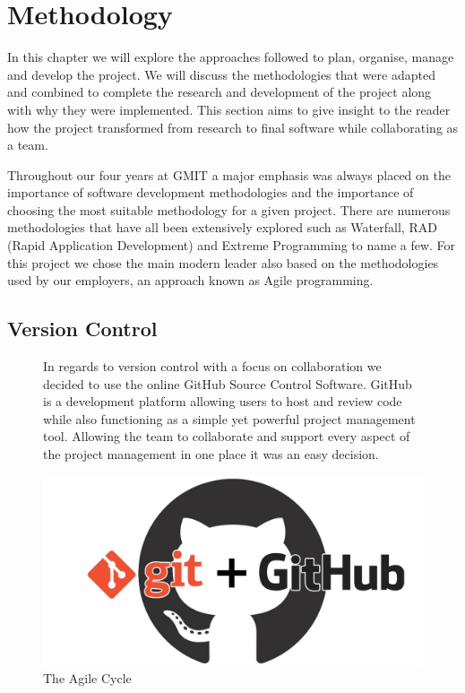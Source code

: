 \chapter{Methodology} \label{methodology}
In this chapter we will explore the approaches followed to plan, organise, manage and develop the project. We will discuss the methodologies that were adapted and combined to complete the research and development of the project along with why they were implemented. This section aims to give insight to the reader how the project transformed from research to final software while collaborating as a team.

Throughout our four years at GMIT a major emphasis was always placed on the importance of software development methodologies and the importance of choosing the most suitable methodology for a given project. There are numerous  methodologies that have all been extensively explored such as Waterfall, RAD (Rapid Application Development) and Extreme Programming to name a few. For this project we chose the main modern leader also based on the methodologies used by our employers, an approach known as Agile programming.

\section{Version Control}
\begin{figure}[H]
\begin{minipage}{.5\textwidth}  %
\lstset{linewidth = 4cm, breaklines=true} %
In regards to version control with a focus on collaboration we decided to use the online GitHub Source Control Software. GitHub is a development platform allowing users to host and review code while also functioning as a simple yet powerful project management tool. Allowing the team to collaborate and support every aspect of the project management in one place it was an easy decision. 

\end{minipage}
\qquad %
\begin{minipage}{0.4\textwidth} %
 \includegraphics[width=\linewidth]{img/git.jpeg}
\caption{The Agile Cycle}
\end{minipage}
\end{figure}

